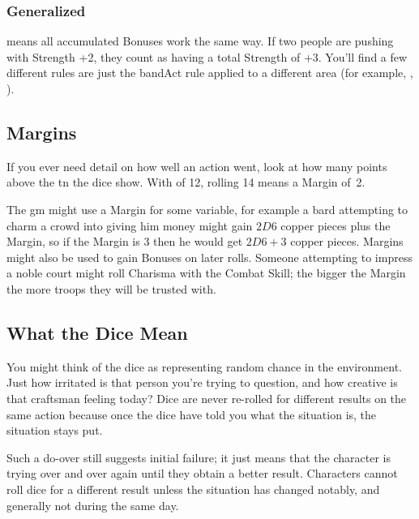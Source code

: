 \begin{multicols}{2}
\subsubsection{Generalized }
means all accumulated Bonuses work the same way.
If two people are pushing with Strength +2, they count as having a total Strength of +3.
You'll find a few different rules are just the \gls{bandAct} rule applied to a different area (for example, , ).

\subsection{Margins}
\label{margin}

If you ever need detail on how well an action went, look at how many points above the \gls{tn} the dice show.
With  of 12, rolling 14 means a Margin of~2.

The \gls{gm} might use a Margin for some variable, for example a bard attempting to charm a crowd into giving him money might gain $2D6$ copper pieces plus the Margin, so if the Margin is 3 then he would get $2D6+3$ copper pieces.
Margins might also be used to gain Bonuses on later rolls.
Someone attempting to impress a noble court might roll Charisma with the Combat Skill; the bigger the Margin the more troops they will be trusted with.

\subsection{What the Dice Mean}

You might think of the dice as representing random chance in the environment. Just how irritated is that person you're trying to question, and how creative is that craftsman feeling today? Dice are never re-rolled for different results on the same action because once the dice have told you what the situation is, the situation stays put.

Such a do-over still suggests initial failure; it just means that the character is trying over and over again until they obtain a better result.
Characters cannot roll dice for a different result unless the situation has changed notably, and generally not during the same day.

\end{multicols}

\section{}
\label{weight}

